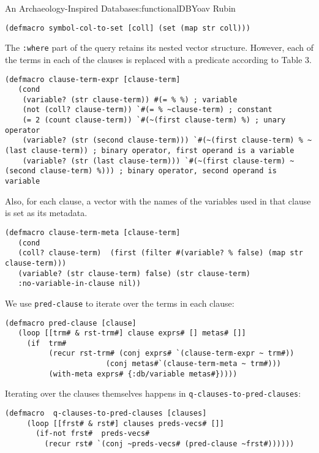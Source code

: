 \begin{aosachapter}{An Archaeology-Inspired Database}{s:functionalDB}{Yoav Rubin}
\begin{verbatim}
(defmacro symbol-col-to-set [coll] (set (map str coll)))
\end{verbatim}

The \texttt{:where} part of the query retains its nested vector
structure. However, each of the terms in each of the clauses is replaced
with a predicate according to Table 3.

\begin{verbatim}
(defmacro clause-term-expr [clause-term]
   (cond
    (variable? (str clause-term)) #(= % %) ; variable
    (not (coll? clause-term)) `#(= % ~clause-term) ; constant
    (= 2 (count clause-term)) `#(~(first clause-term) %) ; unary operator
    (variable? (str (second clause-term))) `#(~(first clause-term) % ~(last clause-term)) ; binary operator, first operand is a variable
    (variable? (str (last clause-term))) `#(~(first clause-term) ~(second clause-term) %))) ; binary operator, second operand is variable
\end{verbatim}

Also, for each clause, a vector with the names of the variables used in
that clause is set as its metadata.

\begin{verbatim}
(defmacro clause-term-meta [clause-term]
   (cond
   (coll? clause-term)  (first (filter #(variable? % false) (map str clause-term))) 
   (variable? (str clause-term) false) (str clause-term) 
   :no-variable-in-clause nil))
\end{verbatim}

We use \texttt{pred-clause} to iterate over the terms in each clause:

\begin{verbatim}
(defmacro pred-clause [clause]
   (loop [[trm# & rst-trm#] clause exprs# [] metas# []]
     (if  trm#
          (recur rst-trm# (conj exprs# `(clause-term-expr ~ trm#)) 
                       (conj metas#`(clause-term-meta ~ trm#)))
          (with-meta exprs# {:db/variable metas#}))))
\end{verbatim}

Iterating over the clauses themselves happens in
\texttt{q-clauses-to-pred-clauses}:

\begin{verbatim}
(defmacro  q-clauses-to-pred-clauses [clauses]
     (loop [[frst# & rst#] clauses preds-vecs# []]
       (if-not frst#  preds-vecs#
         (recur rst# `(conj ~preds-vecs# (pred-clause ~frst#))))))
\end{verbatim}


\end{aosachapter}
